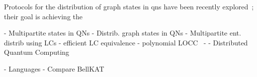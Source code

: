 
 Protocols for the distribution of graph states in \acp{qn} have been recently explored~\cite{fischer2020distributinggraph,meignant2019distributing}; their goal is achieving the 

- Multipartite states in QNs
    - Distrib. graph states in QNs \cite{fischer2020distributinggraph,meignant2019distributing}
    - Multipartite ent. distrib using LCs \cite{sen_kenneth_2025subgraphcomp_multipart_entangDistrib}
    - efficient LC equivalence \cite{vandennest2004efficientLCgraph}
    - polynomial LOCC~\cite{dahlbergWehner2018graph}
    - \cite{naphan2026bridging,azuma2015_all-photonic,niu2023_all-photonic,munro2012}
    - Distributed Quantum Computing~\cite{caleffi2024dqcsurvey}

     
- Languages
    - Compare BellKAT 
